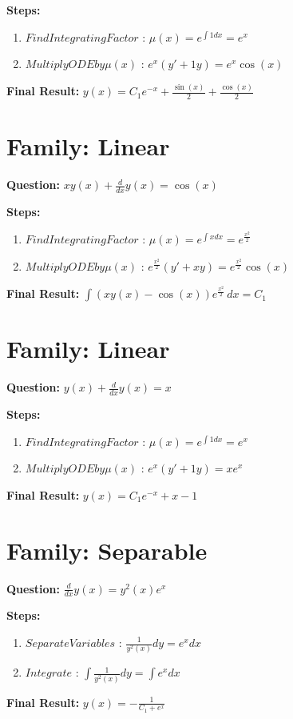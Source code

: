 \documentclass{article}
\begin{document}
\textbf{Steps:}
\begin{enumerate}
\item $Find Integrating Factor$ :  $\mu(x) = e^{\int 1 dx} = e^{x}$
\item $Multiply ODE by \mu(x)$ :  $e^{x}(y' + 1y) = e^{x} \cos{\left(x \right)}$
\end{enumerate}
\textbf{Final Result:} $y{\left(x \right)} = C_{1} e^{- x} + \frac{\sin{\left(x \right)}}{2} + \frac{\cos{\left(x \right)}}{2}$

\section*{Family: Linear}
\textbf{Question:} $x y{\left(x \right)} + \frac{d}{d x} y{\left(x \right)} = \cos{\left(x \right)}$

\textbf{Steps:}
\begin{enumerate}
\item $Find Integrating Factor$ :  $\mu(x) = e^{\int x dx} = e^{\frac{x^{2}}{2}}$
\item $Multiply ODE by \mu(x)$ :  $e^{\frac{x^{2}}{2}}(y' + xy) = e^{\frac{x^{2}}{2}} \cos{\left(x \right)}$
\end{enumerate}
\textbf{Final Result:} $\int \left(x y{\left(x \right)} - \cos{\left(x \right)}\right) e^{\frac{x^{2}}{2}}\, dx = C_{1}$

\section*{Family: Linear}
\textbf{Question:} $y{\left(x \right)} + \frac{d}{d x} y{\left(x \right)} = x$

\textbf{Steps:}
\begin{enumerate}
\item $Find Integrating Factor$ :  $\mu(x) = e^{\int 1 dx} = e^{x}$
\item $Multiply ODE by \mu(x)$ :  $e^{x}(y' + 1y) = x e^{x}$
\end{enumerate}
\textbf{Final Result:} $y{\left(x \right)} = C_{1} e^{- x} + x - 1$

\section*{Family: Separable}
\textbf{Question:} $\frac{d}{d x} y{\left(x \right)} = y^{2}{\left(x \right)} e^{x}$

\textbf{Steps:}
\begin{enumerate}
\item $Separate Variables$ :  $\frac{1}{y^{2}{\left(x \right)}} dy = e^{x} dx$
\item $Integrate$ :  $\int \frac{1}{y^{2}{\left(x \right)}} dy = \int e^{x} dx$
\end{enumerate}
\textbf{Final Result:} $y{\left(x \right)} = - \frac{1}{C_{1} + e^{x}}$
\end{document}
